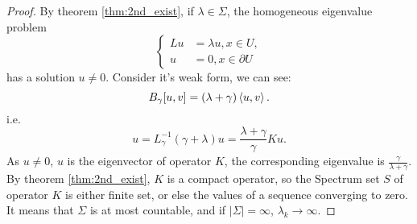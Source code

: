\begin{proof}
    By theorem \ref{thm:2nd_exist}, if $\lambda\in\Sigma$, the homogeneous eigenvalue problem 
    \begin{equation}
        \label{eq:homo-eig-prob}
        \left\{
            \begin{aligned}
            Lu&=\lambda u,x\in U,\\
            u&=0,x\in\partial U
            \end{aligned}
        \right.
    \end{equation}
    has a solution $u\neq 0$. Consider it's weak form, we can see:
    \begin{equation}
        \label{eq:weak_form_for_eig_BVP}
        B_{\gamma}[u,v]=(\lambda+\gamma)\left<u,v\right>.
    \end{equation}
    i.e.
    \begin{equation}
        u=L_{\gamma}^{-1}(\gamma+\lambda)u=\frac{\lambda+\gamma}{\gamma}Ku.
    \end{equation}
    As $u\neq 0$, $u$ is the eigenvector of operator $K$, the corresponding eigenvalue is $\frac{\gamma}{\lambda+\gamma}$. By theorem \ref{thm:2nd_exist}, $K$ is a compact operator, so the Spectrum set $S$ of operator $K$ is either finite set, or else the values of a sequence converging to zero. It means that $\Sigma$ is at most countable, and if $|\Sigma|=\infty$, $\lambda_{k}\rightarrow\infty$.
\end{proof}

